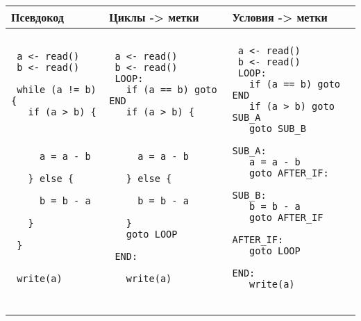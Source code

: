 \documentclass[a4paper, 12pt]{extarticle}
\begin{document}
\newcommand{\TabWidth}{2in}
\begin{tabular}{lll}
 Псевдокод & Циклы -> метки & Условия -> метки\\
 \hline 
 & & \\
 \begin{minipage}{1.5in} 
\begin{verbatim}
 a <- read()
 b <- read()
 
 while (a != b) {
   if (a > b) {
   
   
   
     a = a - b
     
   } else {
      
     b = b - a
     
   }
   
 }
 
  
 write(a)
 
\end{verbatim}
\end{minipage}
&
\begin{minipage}{\TabWidth} 
\begin{verbatim}
 a <- read()
 b <- read() 
 LOOP:
   if (a == b) goto END
   if (a > b) {
   
   
      
     a = a - b
     
   } else {
   
     b = b - a
     
   } 
   goto LOOP

 END:
  
   write(a)
   
\end{verbatim}
\end{minipage}
&
\begin{minipage}{\TabWidth} 
\begin{verbatim}
 a <- read()
 b <- read() 
 LOOP:
   if (a == b) goto END
   if (a > b) goto SUB_A
   goto SUB_B
   
SUB_A:
   a = a - b
   goto AFTER_IF:  
   
SUB_B:
   b = b - a
   goto AFTER_IF
   
AFTER_IF:   
   goto LOOP
 
END: 
   write(a)
   
\end{verbatim}
\end{minipage} \\
\hline
\end{tabular}
\end{document}
